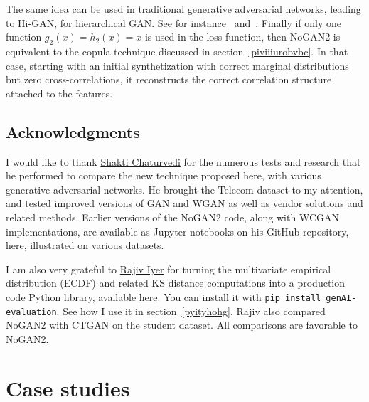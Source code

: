\documentclass[oneside,10pt]{book}
\begin{document}
The same idea can be used in traditional generative adversarial networks, leading to Hi-GAN, for \textcolor{index}{hierarchical GAN}.
See for instance~\cite{Weifuge} and~\cite{nathieeewgan}. Finally if only one function $g_2(x) = h_2(x) = x$ is used in the loss function,  then NoGAN2
 is equivalent to the  \textcolor{index}{copula} technique discussed in section~\ref{piviiiurobvbc}.
In that case, starting with
 an initial synthetization with correct marginal distributions but zero cross-correlations, it reconstructs the correct correlation structure attached
 to the features.

\subsection{Acknowledgments}

I would like to thank
 \href{https://www.linkedin.com/in/shakti-chaturvedi-49aab9106/}{Shakti Chaturvedi} for the numerous tests and research that he performed to compare
the new technique proposed here,  with various generative adversarial networks. He brought the Telecom dataset to my attention, and tested improved versions of GAN and WGAN as well as vendor solutions and related methods. Earlier versions of the NoGAN2  code, along with WCGAN implementations,  are available as Jupyter notebooks on his GitHub repository,
 \href{https://github.com/shakti2594/Shared_Folder/blob/main/Main/DeepResampling_diabates.ipynb}{here}, illustrated on various datasets.

I am also very grateful to \href{https://www.linkedin.com/in/rajivi/}{Rajiv Iyer} for turning the multivariate empirical distribution (ECDF) and related KS distance computations
 into a production code Python library, available \href{https://pypi.org/project/genai-evaluation/}{here}.
You can install it with \texttt{pip install genAI-evaluation}. See how I use it in section~\ref{pyityhohg}.
Rajiv also compared NoGAN2 with CTGAN on the student dataset. All comparisons are favorable to NoGAN2.


\section{Case studies}\label{daberikh}
\end{document}
